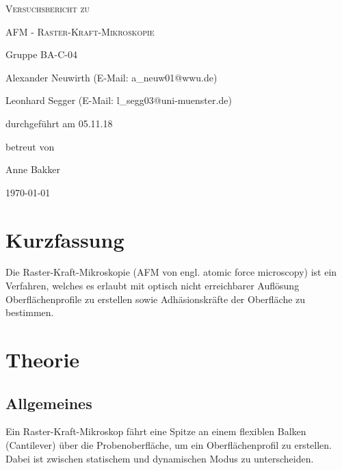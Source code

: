 \documentclass[
	a4paper,
	12pt,
	pagesize,
	ngerman
]{scrartcl}
\begin{document}
	\begin{titlepage}
		\centering
		{\scshape\LARGE Versuchsbericht zu \par}
		\vspace{1cm}
		{\scshape\huge AFM - Raster-Kraft-Mikroskopie \par}
		\vspace{2.5cm}
		{\LARGE Gruppe BA-C-04 \par}
		\vspace{0.5cm}

		{\large Alexander Neuwirth (E-Mail: a\_neuw01@wwu.de) \par}
		{\large Leonhard Segger (E-Mail: l\_segg03@uni-muenster.de) \par}
		\vfill

		durchgeführt am 05.11.18\par
		betreut von\par
		{\large Anne Bakker}

		\vfill

		{\large \today\par}
	\end{titlepage}
	\tableofcontents
	\newpage


	\section{Kurzfassung}
	Die Raster-Kraft-Mikroskopie (AFM von engl. atomic force microscopy) ist ein Verfahren, welches es erlaubt mit optisch nicht erreichbarer Auflösung Oberflächenprofile zu erstellen sowie Adhäsionskräfte der Oberfläche zu bestimmen. %

	\section{Theorie}
	\label{sec_theorie}
	
	\subsection{Allgemeines}
	Ein Raster-Kraft-Mikroskop fährt eine Spitze an einem flexiblen Balken (Cantilever) über die Probenoberfläche, um ein Oberflächenprofil zu erstellen.
	Dabei ist zwischen statischem und dynamischen Modus zu unterscheiden.
	
\end{document}
